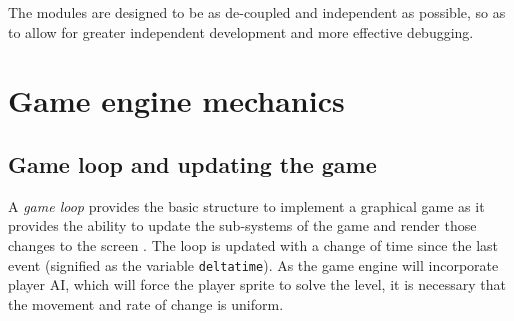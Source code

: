 \documentclass[11pt, a4paper, oneside]{report} %
\begin{document}
The modules are designed to be as de-coupled and independent as possible, so as
to allow for greater independent development and more effective debugging.










\section{Game engine mechanics}


\subsection{Game loop and updating the game}

A \textit{game loop} provides the basic structure to implement a graphical game
as it provides the ability to update the sub-systems of the game and render
those changes to the screen \cite{Gregory:2009, Haller:2013:SGD:2556030}. The
loop is updated with a change of time since the last event (signified as the
variable \texttt{delta\textunderscore time}). As the game engine will
incorporate player AI, which will force the player sprite to solve the level, it
is necessary that the movement and rate of change is uniform.
\end{document}
